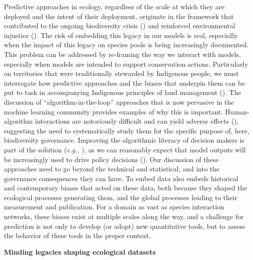 \begin{refsection}
Predictive approaches in ecology, regardless of the scale at which they
are deployed and the intent of their deployment, originate in the
framework that contributed to the ongoing biodiversity crisis
(\cite{Adam2014Elephant}) and reinforced environmental injustice
(\cite{Choudry2013Saving, Dominguez2020Decolonising}). The risk of
embedding this legacy in our models is real, especially when the impact
of this legacy on species pools is being increasingly documented. This
problem can be addressed by re-framing the way we interact with models,
especially when models are intended to support conservation actions.
Particularly on territories that were traditionally stewarded by
Indigenous people, we must interrogate how predictive approaches and the
biases that underpin them can be put to task in accompanying Indigenous
principles of land management (\cite{Eichhorn2019Steps,
Nokmaq2021Awakening}). The discussion of ``algorithm-in-the-loop''
approaches that is now pervasive in the machine learning community
provides examples of why this is important. Human-algorithm interactions
are notoriously difficult and can yield adverse effects
(\cite{Green2019Disparate, Stevenson2021Algorithmic}), suggesting the
need to systematically study them for the specific purpose of, here,
biodiversity governance. Improving the algorithmic literacy of decision
makers is part of the solution (\emph{e.g.,} \cite{Lamba2019Deep, 
MoseboFernandes2020Machine}), as we can reasonably expect that model
outputs will be increasingly used to drive policy decisions
(\cite{Weiskopf2022Increasing}). Our discussion of these approaches need
to go beyond the technical and statistical, and into the governance
consequences they can have. To embed data also embeds historical and
contemporary biases that acted on these data, both because they shaped
the ecological processes generating them, and the global processes
leading to their measurement and publication. For a domain as vast as
species interaction networks, these biases exist at multiple scales
along the way, and a challenge for prediction is not only to develop (or
adopt) new quantitative tools, but to assess the behavior of these tools
in the proper context.

\begin{summary}\label{box:people}
\textbf{Minding legacies shaping ecological datasets}


\end{summary}
\end{refsection}
